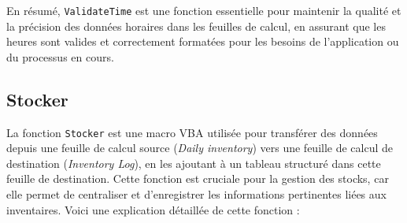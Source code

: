 \documentclass[a4paper, oneside, 12pt, final]{extreport}
\begin{document}
En résumé, \texttt{ValidateTime} est une fonction essentielle pour maintenir la qualité et la précision des données horaires dans les feuilles de calcul, en assurant que les heures sont valides et correctement formatées pour les besoins de l'application ou du processus en cours.
\subsection{Stocker}

La fonction \texttt{Stocker} est une macro VBA utilisée pour transférer des données depuis une feuille de calcul source (\textit{Daily inventory}) vers une feuille de calcul de destination (\textit{Inventory Log}), en les ajoutant à un tableau structuré dans cette feuille de destination. Cette fonction est cruciale pour la gestion des stocks, car elle permet de centraliser et d'enregistrer les informations pertinentes liées aux inventaires. Voici une explication détaillée de cette fonction :
\end{document}
